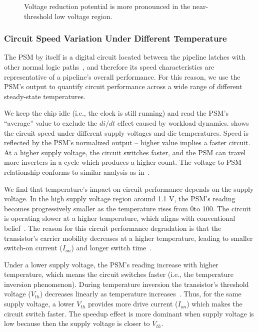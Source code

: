 \begin{figure}[t!]
\begin{minipage}{0.32\linewidth}
      \caption{Voltage reduction potential is more pronounced in the near-threshold low voltage region.}
      \label{fig:uv-potential} 
    \end{minipage}
\end{figure}

\subsubsection{Circuit Speed Variation Under Different Temperature}
\label{sec:tistate:characterize:psm}

The PSM by itself is a digital circuit located between the pipeline latches with other normal logic paths~\cite{sriram2016avfs}, and therefore its speed characteristics are representative of a pipeline's overall performance. For this reason, we use the PSM's output to quantify circuit performance across a wide range of different steady-state temperatures. 

We keep the chip idle (i.e., the clock is still running) and read the PSM's ``average'' value to exclude the $di/dt$ effect caused by workload dynamics.  shows the circuit speed under different supply voltages and die temperatures. Speed is reflected by the PSM's normalized output -- higher value implies a faster circuit. At a higher supply voltage, the circuit switches faster, and the PSM can travel more inverters in a cycle which produces a higher count. The voltage-to-PSM relationship conforms to similar analysis as in~\cite{zu2015adaptive}.

We find that temperature's impact on circuit performance depends on the supply voltage. In the high supply voltage region around 1.1 V, the PSM's reading becomes progressively smaller as the temperature rises from 0\C to 100\C. The circuit is operating slower at a higher temperature, which aligns with conventional belief~\cite{leng2015safe}. The reason for this circuit performance degradation is that the transistor's carrier mobility decreases at a higher temperature, leading to smaller switch-on current ($I_{on}$) and longer switch time~\cite{wolpert2012temperature}.

Under a lower supply voltage, the PSM's reading increase with higher temperature, which means the circuit switches faster (i.e., the temperature inversion phenomenon). During temperature inversion the transistor's threshold voltage ($V_{th}$) decreases linearly as temperature increases~\cite{wolpert2012temperature,park1995reversal,dasdan2006handling}. Thus, for the same supply voltage, a lower $V_{th}$ provides more drive current ($I_{on}$) which makes the circuit switch faster. The speedup effect is more dominant when supply voltage is low because then the supply voltage is closer to $V_{th}$.

